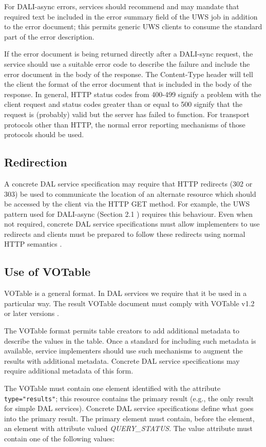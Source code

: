 \documentclass[11pt,letter]{ivoa}
\begin{document}
For DALI-async errors, services should recommend and may mandate that required
text be included in the error summary field of the UWS job in addition to the
error document; this permits generic UWS clients to consume the standard part of
the error description.

If the error document is being returned directly after a DALI-sync request, the
service should use a suitable error code to describe the failure and include the
error document in the body of the response. The Content-Type header will tell
the client the format of the error document that is included in the body of the
response. In general, HTTP status codes from 400-499 signify a problem with the
client request and status codes greater than or equal to 500 signify that the
request is (probably) valid but the server has failed to function. For transport
protocols other than HTTP, the normal error reporting mechanisms of those
protocols should be used.

\subsection{Redirection}
\label{sec:redirects}
A concrete DAL service specification may require that HTTP redirects (302 or
303) be used to communicate the location of an alternate resource which should
be accessed by the client via the HTTP GET method. For example, the UWS pattern
used for DALI-async (Section 2.1 ) requires this behaviour. Even when not
required, concrete DAL service specifications must allow implementers to use
redirects and clients must be prepared to follow these redirects using normal
HTTP semantics \citep{std:HTTP}.

\subsection{Use of VOTable}
\label{sec:use-votable}
VOTable is a general format. In DAL services we require that it be used in a
particular way. The result VOTable document must comply with VOTable
v1.2 or later versions
\citep{2019ivoa.spec.1021O}.


The VOTable format permits table creators to add additional metadata to describe
the values in the table. Once a standard for including such metadata is
available, service implementers should use such mechanisms to augment the
results with additional metadata. Concrete DAL service specifications may
require additional metadata of this form.

The VOTable must contain one   element identified with the attribute
\verb|type="results"|; this resource contains the primary result (e.g., the only result
for simple DAL services). Concrete DAL service specifications define what goes
into the primary result. The primary  element must contain, before the
 element, an
 element with attribute  valued \emph{QUERY\_STATUS}. The value
attribute must contain one of the following values:
\end{document}
